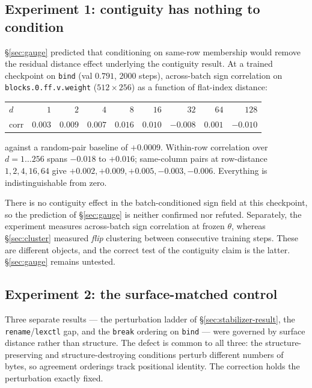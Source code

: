 \subsection{Experiment 1: contiguity has nothing to condition}
\label{sec:contig}

\S\ref{sec:gauge} predicted that conditioning on same-row membership would
remove the residual distance effect underlying the contiguity result. At a
trained checkpoint on \texttt{bind} (val $0.791$, $2000$ steps), across-batch
sign correlation on \texttt{blocks.0.ff.v.weight} ($512\times256$) as a
function of flat-index distance:

\begin{center}
\begin{tabular}{lrrrrrrrr}
\hline
$d$ & $1$ & $2$ & $4$ & $8$ & $16$ & $32$ & $64$ & $128$ \\
corr & $0.003$ & $0.009$ & $0.007$ & $0.016$ & $0.010$ & $-0.008$ & $0.001$ & $-0.010$ \\
\hline
\end{tabular}
\end{center}

against a random-pair baseline of $+0.0009$. Within-row correlation over
$d=1\ldots256$ spans $-0.018$ to $+0.016$; same-column pairs at row-distance
$1,2,4,16,64$ give $+0.002,+0.009,+0.005,-0.003,-0.006$. Everything is
indistinguishable from zero.

\begin{observation}
\label{obs:contig-null}
There is no contiguity effect in the batch-conditioned sign field at this
checkpoint, so the prediction of \S\ref{sec:gauge} is neither confirmed nor
refuted. Separately, the experiment measures across-batch sign correlation at
frozen $\theta$, whereas \S\ref{sec:cluster} measured \emph{flip} clustering
between consecutive training steps. These are different objects, and the
correct test of the contiguity claim is the latter. \S\ref{sec:gauge} remains
untested.
\end{observation}

\subsection{Experiment 2: the surface-matched control}
\label{sec:matched}

Three separate results --- the perturbation ladder of \S\ref{sec:stabilizer-result},
the \texttt{rename}/\texttt{lexctl} gap, and the \texttt{break} ordering on
\texttt{bind} --- were governed by surface distance rather than structure. The
defect is common to all three: the structure-preserving and
structure-destroying conditions perturb different numbers of bytes, so
agreement orderings track positional identity. The correction holds the
perturbation exactly fixed.

